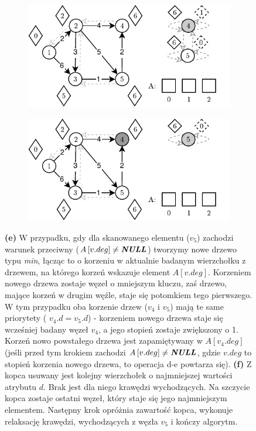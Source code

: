 \begin{figure}[!htbp]
	\ContinuedFloat
	\centering
	\begin{subfigure}[b]{0.45\textwidth}
		\includegraphics[width=\textwidth]{Chapter_II/FIBONACCI-Example/e.pdf}
		\caption{}
	\end{subfigure}%
	\begin{subfigure}[b]{0.45\textwidth}
		\includegraphics[width=\textwidth]{Chapter_II/FIBONACCI-Example/f.pdf}
		\caption{}
	\end{subfigure}
	\caption{ \textbf{(e)} W przypadku, gdy dla skanowanego elementu ($v_{5}$) zachodzi warunek przeciwny ($A \left[ v.deg \right] \neq \emph{\textbf{NULL}} $) tworzymy nowe drzewo typu \textit{min}, łącząc to o korzeniu w aktualnie badanym wierzchołku z drzewem, na którego korzeń wskazuje element $A \left[ v.deg \right]$. Korzeniem nowego drzewa zostaje węzeł o mniejszym kluczu, zaś drzewo, mające korzeń w drugim węźle, staje się potomkiem tego pierwszego. W tym przypadku oba korzenie drzew ($v_{4}$ i $v_{5}$) mają te same priorytety ( $v_{4}.d = v_{5}.d$) - korzeniem nowego drzewa staje się wcześniej badany węzeł $v_{4}$, a jego stopień zostaje zwiększony o 1. Korzeń nowo powstałego drzewa jest zapamiętywany w $A \left[ v_{4}.deg \right]$ (jeśli przed tym krokiem zachodzi $A \left[ v.deg \right] \neq \emph{\textbf{NULL}} $, gdzie $v.deg$ to stopień korzenia nowego drzewa, to operacja d-e powtarza się). \textbf{(f)} Z kopca usuwany jest kolejny wierzchołek o najmniejszej wartości atrybutu $d$. Brak jest dla niego krawędzi wychodzących. Na szczycie kopca zostaje ostatni węzeł, który staje się jego najmniejszym elementem. Następny krok opróżnia zawartość kopca, wykonuje relaksację krawędzi, wychodzących z węzła $v_{5}$ i kończy algorytm. } \label{fig:exampleFibonacci2}
\end{figure}

